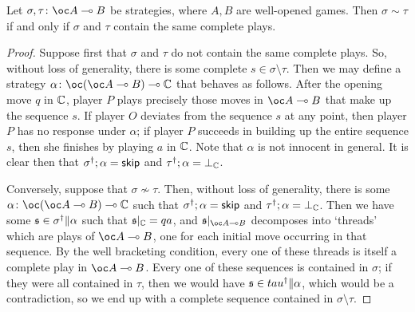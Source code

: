 \documentclass[11pt]{report}
\begin{document}
\begin{proposition}
  Let $\sigma,\tau\from \oc A \implies B$ be strategies, where $A,B$ are well-opened games.  
  Then $\sigma\sim\tau$ if and only if $\sigma$ and $\tau$ contain the same complete plays.
\end{proposition}
\begin{proof}
  Suppose first that $\sigma$ and $\tau$ do not contain the same complete plays.  
  So, without loss of generality, there is some complete $s\in\sigma\setminus\tau$.
  Then we may define a strategy $\alpha \from \oc(\oc A \implies B) \implies \bC$ that behaves as follows.  
  After the opening move $q$ in $\mathbb{C}$, player $P$ plays precisely those moves in $\oc A \implies B$ that make up the sequence $s$.  
  If player $O$ deviates from the sequence $s$ at any point, then player $P$ has no response under $\alpha$; if player $P$ succeeds in building up the entire sequence $s$, then she finishes by playing $a$ in $\mathbb{C}$.  
  Note that $\alpha$ is not innocent in general.
  It is clear then that $\sigma^\dag;\alpha={\mathsf{skip}}$ and $\tau^\dag;\alpha=\bot_{\mathbb{C}}$.

  Conversely, suppose that $\sigma\not\sim\tau$.  
  Then, without loss of generality, there is some $\alpha \from \oc(\oc A\implies B) \implies \bC$ such that $\sigma^\dag;\alpha={\mathsf{skip}}$ and $\tau^\dag;\alpha=\bot_{\mathbb{C}}$.  
  Then we have some $\mathfrak s\in\sigma^\dag\|\alpha$ such that $\mathfrak s\vert_{\mathbb{C}}=qa$, and $\s\vert_{\oc A \implies B}$ decomposes into `threads' which are plays of $\oc A \implies B$, one for each initial move occurring in that sequence.  
  By the well bracketing condition, every one of these threads is itself a complete play in $\oc A \implies B$.  
  Every one of these sequences is contained in $\sigma$; if they were all contained in $\tau$, then we would have $\mathfrak s\in\\tau^\dag\|\alpha$, which would be a contradiction, so we end up with a complete sequence contained in $\sigma\setminus\tau$.
\end{proof}



\end{document}
